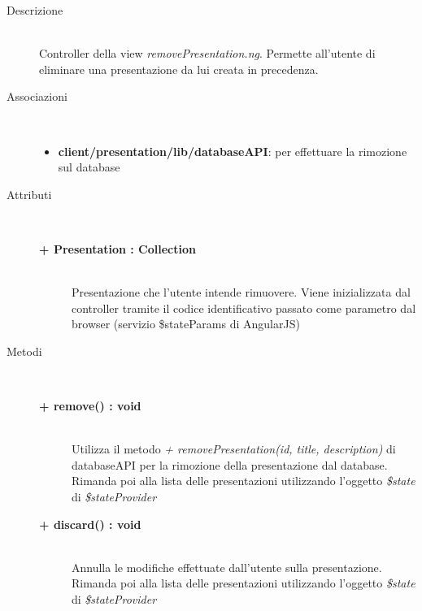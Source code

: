 \begin{description}
\item[Descrizione] \hfill \\
	Controller della view \textit{removePresentation.ng}. Permette all'utente di eliminare una presentazione da lui creata in precedenza.
	

\item[Associazioni] \hfill \\
	\begin{itemize}
		\item \textbf{client/presentation/lib/databaseAPI}: per effettuare la rimozione sul database
	\end{itemize}

	
\item[Attributi] \hfill \\
	\begin{description}
		\item[\textbf{+ Presentation : Collection			}] \hfill \\
			Presentazione che l'utente intende rimuovere. Viene inizializzata dal controller tramite il codice identificativo passato come parametro dal browser (servizio \$stateParams di AngularJS)
	\end{description}
	
	
\item[Metodi] \hfill \\

	\begin{description}
		\item[\textbf{\color{blue}+ remove() : void			}] \hfill \\
			Utilizza il metodo \textit{+ removePresentation(id, title, description)} di databaseAPI per la rimozione della presentazione dal database. Rimanda poi alla lista delle presentazioni utilizzando l'oggetto \textit{\$state} di \textit{\$stateProvider}
	\end{description}
	
	\begin{description}
		\item[\textbf{\color{blue}+ discard() : void			}] \hfill \\
			Annulla le modifiche effettuate dall'utente sulla presentazione. Rimanda poi alla lista delle presentazioni utilizzando l'oggetto \textit{\$state} di \textit{\$stateProvider}
	\end{description}
	
	
	
\end{description}















